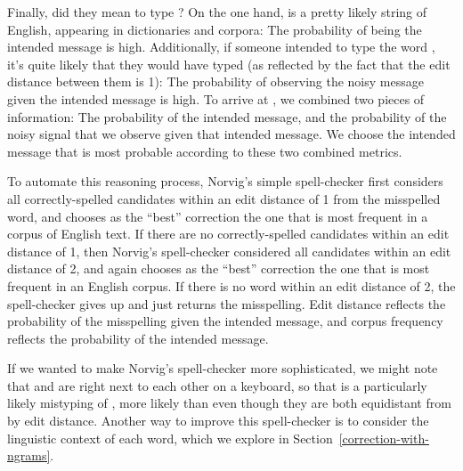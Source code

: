 Finally, did they mean to type ?  On the one hand,  is a pretty likely string of English, appearing in dictionaries and corpora: The probability of  being the intended message is high.  Additionally, if someone intended to type the word , it's quite likely that they would have typed  (as reflected by the fact that the edit distance between them is 1): The probability of observing the noisy message  given the intended message  is high.  To arrive at , we combined two pieces of information: The probability of the intended message, and the probability of the noisy signal that we observe given that intended message.  We choose the intended message that is most probable according to these two combined metrics.

To automate this reasoning process, Norvig's simple spell-checker first considers all correctly-spelled candidates within an edit distance of 1 from the misspelled word, and chooses as the ``best'' correction the one that is most frequent in a corpus of English text.  If there are no correctly-spelled candidates within an edit distance of 1, then Norvig's spell-checker considered all candidates within an edit distance of 2, and again chooses as the ``best'' correction the one that is most frequent in an English corpus.  If there is no word within an edit distance of 2, the spell-checker gives up and just returns the misspelling.  Edit distance reflects the probability of the misspelling given the intended message, and corpus frequency reflects the probability of the intended message.

If we wanted to make Norvig's spell-checker more sophisticated, we
might note that  and  are right next to each other
on a keyboard, so that  is a particularly likely
mistyping of , more likely than  even
though they are both equidistant from  by edit distance.
Another way to improve this spell-checker is to consider the
linguistic context of each word, which we explore in
Section~\ref{correction-with-ngrams}.



